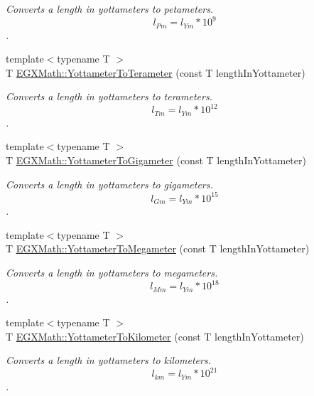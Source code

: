 \begin{DoxyCompactItemize}
\begin{DoxyCompactList}\small\item\em Converts a length in yottameters to petameters. \[ l_{Pm}=l_{Ym} * 10^{9} \]. \end{DoxyCompactList}\item 
{\footnotesize template$<$typename T $>$ }\\T \mbox{\hyperlink{group___e_g_x_math-_conversions-_length_conversions-_yottameter-_s_i_ga24c70c7a3a5081e794d7cf4a37264b6c}{E\+G\+X\+Math\+::\+Yottameter\+To\+Terameter}} (const T length\+In\+Yottameter)
\begin{DoxyCompactList}\small\item\em Converts a length in yottameters to terameters. \[ l_{Tm}=l_{Ym} * 10^{12} \]. \end{DoxyCompactList}\item 
{\footnotesize template$<$typename T $>$ }\\T \mbox{\hyperlink{group___e_g_x_math-_conversions-_length_conversions-_yottameter-_s_i_ga206834b7977e8b15c0fe06e279655c2b}{E\+G\+X\+Math\+::\+Yottameter\+To\+Gigameter}} (const T length\+In\+Yottameter)
\begin{DoxyCompactList}\small\item\em Converts a length in yottameters to gigameters. \[ l_{Gm}=l_{Ym} * 10^{15} \]. \end{DoxyCompactList}\item 
{\footnotesize template$<$typename T $>$ }\\T \mbox{\hyperlink{group___e_g_x_math-_conversions-_length_conversions-_yottameter-_s_i_ga6c00035c9e60ba95c4670d34aef3ec2a}{E\+G\+X\+Math\+::\+Yottameter\+To\+Megameter}} (const T length\+In\+Yottameter)
\begin{DoxyCompactList}\small\item\em Converts a length in yottameters to megameters. \[ l_{Mm}=l_{Ym} * 10^{18} \]. \end{DoxyCompactList}\item 
{\footnotesize template$<$typename T $>$ }\\T \mbox{\hyperlink{group___e_g_x_math-_conversions-_length_conversions-_yottameter-_s_i_ga3de441b3e33fe175b75425711d1b92e1}{E\+G\+X\+Math\+::\+Yottameter\+To\+Kilometer}} (const T length\+In\+Yottameter)
\begin{DoxyCompactList}\small\item\em Converts a length in yottameters to kilometers. \[ l_{km}=l_{Ym} * 10^{21} \]. \end{DoxyCompactList}\item 

\end{DoxyCompactItemize}
